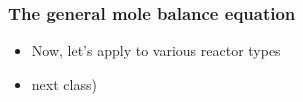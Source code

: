 \begin{frame}\frametitle{The general mole balance equation}
	\begin{itemize}
		\item	Now, let's apply to various reactor types 
		\item next class)
	\end{itemize}
\end{frame}

\begin{comment}

\section{Batch}
\begin{frame}\frametitle{1.3 Batch reactors}
	\begin{itemize}
		\item	No inflow or outflow.
		\item	Charge reactors with reactants then close up.

		\item	Typically perfectly mixed, so $\int_V r_j(V)dV$ can be replaced by $r_jV$
	\end{itemize}
\end{frame}

\begin{frame}
	\begin{itemize}
		\item	<1->{ The mole balance reduces to $$\frac{dN_j}{dt} = r_jV$$ }
		\item	<1->{\textbf{Note:} $V$ is \emph{not} assumed to be constant here. It could be a function of time or of the extent of reaction (and indirectly a function of time).}
	\end{itemize}
\end{frame}

\begin{frame}\frametitle{Problem 1.1}
	\begin{itemize}
		\item	<1->{$$A\longrightarrow2B, -r_A = kC_A, k = 0.23\text{min}^{-1}$$ in a const volume batch reactor. $C_{A0} = 2$mol/L, $V=10$L. How long does it take to reduce the conc of $A$ in reactor to 0.2 mol/L? }
		\item	<1->{\textcolor{blue}{Solution: {\bf First solve analytically}} $$\frac{dN_A}{dt} = r_AV = -kC_AV$$ }
	\end{itemize}
\end{frame}


\end{comment}
